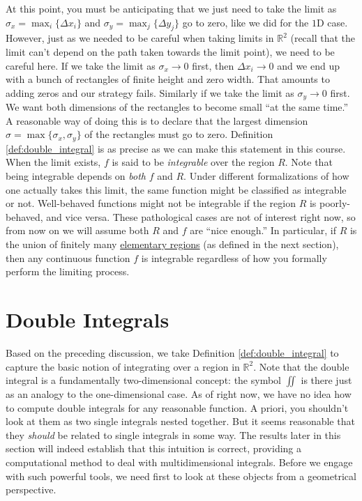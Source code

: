 At this point, you must be anticipating that we just need to take the limit as $\sigma_x = \max_i \{\Delta x_i\}$ and $\sigma_y = \max_j \{\Delta y_j\}$ go to zero, like we did for the $1\text{D}$ case. However, just as we needed to be careful when taking limits in $\mathbb{R}^2$ (recall that the limit can't depend on the path taken towards the limit point), we need to be careful here. If we take the limit as $\sigma_x \rightarrow 0$ first, then $\Delta x_i \rightarrow 0$ and we end up with a bunch of rectangles of finite height and zero width. That amounts to adding zeros and our strategy fails. Similarly if we take the limit as $\sigma_y \rightarrow 0$ first. We want both dimensions of the rectangles to become small ``at the same time.'' A reasonable way of doing this is to declare that the largest dimension $\sigma = \max \{\sigma_x, \sigma_y \}$ of the rectangles must go to zero. Definition \ref{def:double_integral} is as precise as we can make this statement in this course. When the limit exists, $f$ is said to be \textit{integrable} over the region $R$. Note that being integrable depends on \textit{both} $f$ and $R$. Under different formalizations of how one actually takes this limit, the same function might be classified as integrable or not. Well-behaved functions might not be integrable if the region $R$ is poorly-behaved, and vice versa. These pathological cases are not of interest right now, so from now on we will assume both $R$ and $f$ are ``nice enough.'' In particular, if $R$ is the union of finitely many \hyperref[def:elementary_regions]{elementary regions} (as defined in the next section), then any continuous function $f$ is integrable regardless of how you formally perform the limiting process.


\section{Double Integrals}

Based on the preceding discussion, we take Definition \ref{def:double_integral} to capture the basic notion of integrating over a region in $\mathbb{R}^2$. Note that the double integral is a fundamentally two-dimensional concept: the symbol $\iint$ is there just as an analogy to the one-dimensional case. As of right now, we have no idea how to compute double integrals for any reasonable function. A priori, you shouldn't look at them as two single integrals nested together. But it seems reasonable that they \textit{should} be related to single integrals in some way. The results later in this section will indeed establish that this intuition is correct, providing a computational method to deal with multidimensional integrals. Before we engage with such powerful tools, we need first to look at these objects from a geometrical perspective.

